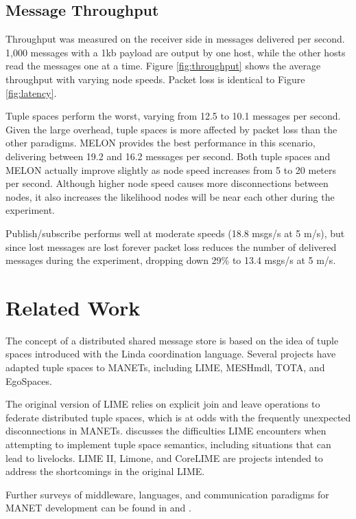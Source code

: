 \documentclass[lnicst]{svmultln}
\begin{document}
\subsection{Message Throughput}

Throughput was measured on the receiver side in messages delivered per second. 1,000 messages with a 1kb payload are output by one host, while the other hosts read the messages one at a time. Figure \ref{fig:throughput} shows the average throughput with varying node speeds. Packet loss is identical to Figure \ref{fig:latency}.

Tuple spaces perform the worst, varying from 12.5 to 10.1 messages per second. Given the large overhead, tuple spaces is more affected by packet loss than the other paradigms. MELON provides the best performance in this scenario, delivering between 19.2 and 16.2 messages per second. Both tuple spaces and MELON actually improve slightly as node speed increases from 5 to 20 meters per second. Although higher node speed causes more disconnections between nodes, it also increases the likelihood nodes will be near each other during the experiment.

Publish/subscribe performs well at moderate speeds (18.8 msgs/s at 5 m/s), but since lost messages are lost forever packet loss reduces the number of delivered messages during the experiment, dropping down 29\% to 13.4 msgs/s at 5 m/s.

\section{Related Work}\label{sec:relatedwork}

The concept of a distributed shared message store is based on the idea of tuple spaces introduced with the Linda\cite{linda} coordination language. Several projects have adapted tuple spaces to MANETs, including LIME\cite{lime}, MESHmdl\cite{meshmdl}, TOTA\cite{tota}, and EgoSpaces\cite{egospaces}.

The original version of LIME relies on explicit join and leave operations to federate distributed tuple spaces, which is at odds with the frequently unexpected disconnections in MANETs. \cite{limerevisted} discusses the difficulties LIME encounters when attempting to implement tuple space semantics, including situations that can lead to livelocks. LIME II\cite{lime2}, Limone\cite{limone}, and CoreLIME\cite{corelime} are projects intended to address the shortcomings in the original LIME.

Further surveys of middleware, languages, and communication paradigms for MANET development can be found in \cite{mine} and \cite{mwtrends}.
\end{document}
